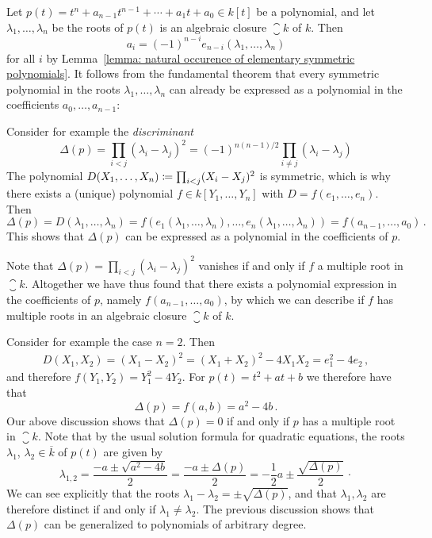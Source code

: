 \begin{example}
  \label{example: multiple roots via symmetric polynomials}
  Let $p(t) = t^n + a_{n-1} t^{n-1} + \dotsb + a_1 t + a_0 \in k[t]$ be a polynomial, and let $\lambda_1, \dotsc, \lambda_n$ be the roots of $p(t)$ is an algebraic closure $\closure{k}$ of $k$.
  Then
  \[
      a_i
    = (-1)^{n-i} e_{n-i}(\lambda_1, \dotsc, \lambda_n)
  \]
  for all $i$ by Lemma~\ref{lemma: natural occurence of elementary symmetric polynomials}.
  It follows from the fundamental theorem that every symmetric polynomial in the roots $\lambda_1, \dotsc, \lambda_n$ can already be expressed as a polynomial in the coefficients $a_0, \dotsc, a_{n-1}$:
  
  Consider for example the \emph{discriminant}
  \[
      \Delta(p)
    = \prod_{i < j} (\lambda_i - \lambda_j)^2
    = (-1)^{n(n-1)/2} \prod_{i \neq j} (\lambda_i - \lambda_j)
  \]
  The polynomial $D(X_1, \dotsc, X_n) \coloneqq \prod_{i < j} (X_i - X_j)^2$ is symmetric, which is why there exists a (unique) polynomial $f \in k[Y_1, \dotsc, Y_n]$ with $D = f(e_1, \dotsc, e_n)$.
  Then
  \[
      \Delta(p)
    = D(\lambda_1, \dotsc, \lambda_n)
    = f(e_1(\lambda_1, \dotsc, \lambda_n), \dotsc, e_n(\lambda_1, \dotsc, \lambda_n))
    = f(a_{n-1}, \dotsc, a_0) \,.
  \]
  This shows that $\Delta(p)$ can be expressed as a polynomial in the coefficients of $p$.
  
  Note that $\Delta(p) = \prod_{i < j} (\lambda_i - \lambda_j)^2$ vanishes if and only if $f$ a multiple root in $\closure{k}$.
  Altogether we have thus found that there exists a polynomial expression in the coefficients of $p$, namely $f(a_{n-1}, \dotsc, a_0)$, by which we can describe if $f$ has multiple roots in an algebraic closure $\closure{k}$ of $k$.
  
  Consider for example the case $n = 2$.
  Then
  \begin{align*}
        D(X_1, X_2)
     =  (X_1 - X_2)^2
     =  (X_1 + X_2)^2 - 4 X_1 X_2
     =  e_1^2 - 4 e_2 \,,
  \end{align*}
  and therefore $f(Y_1, Y_2) = Y_1^2 - 4 Y_2$.
  For $p(t) = t^2 + a t + b$ we therefore have that
  \[
      \Delta(p)
    = f(a,b)
    = a^2 - 4 b \,.
  \]
  Our above discussion shows that $\Delta(p) = 0$ if and only if $p$ has a multiple root in $\closure{k}$.
  Note that by the usual solution formula for quadratic equations, the roots $\lambda_1$, $\lambda_2 \in \overline{k}$ of $p(t)$ are given by
  \[  
      \lambda_{1,2}
    = \frac{-a \pm \sqrt{a^2 - 4b}}{2}
    = \frac{-a \pm \Delta(p)}{2}
    = -\frac{1}{2} a \pm \frac{\sqrt{\Delta(p)}}{2} \,\cdotp
  \]
  We can see explicitly that the roots $\lambda_1 - \lambda_2 = \pm \sqrt{\Delta(p)}$, and that $\lambda_1, \lambda_2$ are therefore distinct if and only if $\lambda_1 \neq \lambda_2$.
  The previous discussion shows that $\Delta(p)$ can be generalized to polynomials of arbitrary degree.
\end{example}



